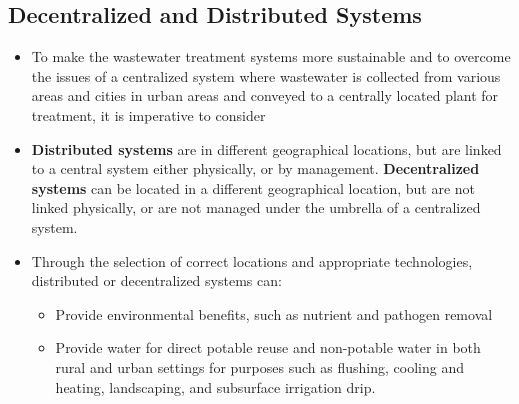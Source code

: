 \subsection{Decentralized and Distributed Systems}
\begin{itemize}
\item To make the wastewater treatment systems more sustainable and to overcome the issues of a centralized system where wastewater is collected from various areas and cities in urban areas and conveyed to a centrally located plant for treatment, it is imperative to consider 
\item \textbf{Distributed systems} are in different geographical locations, but are linked to a central system either physically, or by management. \textbf{Decentralized systems} can be located in a different geographical location, but are not linked physically, or are not managed under the umbrella of a centralized system.
\item Through the selection of correct locations and appropriate technologies, distributed or decentralized systems can:
\begin{itemize}
\item Provide environmental benefits, such as nutrient and pathogen removal
\item Provide water for direct potable reuse and non-potable water in both rural and urban settings for purposes such as flushing, cooling and heating, landscaping, and subsurface irrigation drip.
\end{itemize}
\end{itemize}


